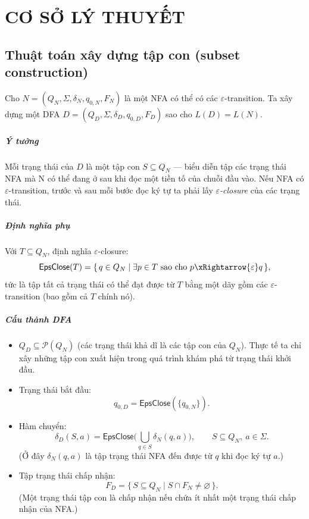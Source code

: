 \documentclass[12pt,a4paper]{report}
\begin{document}
\chapter{CƠ SỞ LÝ THUYẾT}
\section{Thuật toán xây dựng tập con (subset construction)}

Cho \(N = (Q_N, \Sigma, \delta_N, q_{0,N}, F_N)\) là một NFA có thể có các \(\varepsilon\)-transition.  
Ta xây dựng một DFA \(D = (Q_D, \Sigma, \delta_D, q_{0,D}, F_D)\) sao cho \(L(D) = L(N)\).

\paragraph{Ý tưởng}  
Mỗi trạng thái của \(D\) là một tập con \(S \subseteq Q_N\) — biểu diễn tập các trạng thái NFA mà N có thể đang ở sau khi đọc một tiền tố của chuỗi đầu vào. Nếu NFA có \(\varepsilon\)-transition, trước và sau mỗi bước đọc ký tự ta phải lấy \emph{\(\varepsilon\)-closure} của các trạng thái.

\paragraph{Định nghĩa phụ}  
Với \(T \subseteq Q_N\), định nghĩa \(\varepsilon\)-closure:
\[
\mathsf{EpsClose}(T) = \{\, q \in Q_N \mid \exists p \in T \text{ sao cho } p \xRightarrow{\varepsilon} q \,\},
\]
tức là tập tất cả trạng thái có thể đạt được từ \(T\) bằng một dãy gồm các \(\varepsilon\)-transition (bao gồm cả \(T\) chính nó).

\paragraph{Cấu thành DFA}
\begin{itemize}
  \item \(Q_D \subseteq \mathcal{P}(Q_N)\) (các trạng thái khả dĩ là các tập con của \(Q_N\)). Thực tế ta chỉ xây những tập con xuất hiện trong quá trình khám phá từ trạng thái khởi đầu.
  \item Trạng thái bắt đầu:
  \[
  q_{0,D} = \mathsf{EpsClose}(\{q_{0,N}\}).
  \]
  \item Hàm chuyển:
  \[
  \delta_D(S, a) = \mathsf{EpsClose}\Big( \bigcup_{q \in S} \delta_N(q,a) \Big),
  \qquad S \subseteq Q_N,\ a\in\Sigma.
  \]
  (Ở đây \(\delta_N(q,a)\) là tập trạng thái NFA đến được từ \(q\) khi đọc ký tự \(a\).)
  \item Tập trạng thái chấp nhận:
  \[
  F_D = \{\, S \subseteq Q_N \mid S \cap F_N \neq \varnothing \,\}.
  \]
  (Một trạng thái tập con là chấp nhận nếu chứa ít nhất một trạng thái chấp nhận của NFA.)
\end{itemize}
\end{document}
